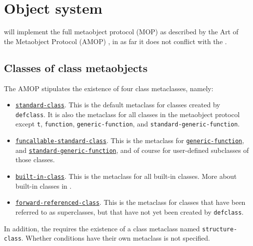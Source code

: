 \chapter{Object system}

\sysname{} will implement the full metaobject protocol (MOP) as
described by the Art of the Metaobject Protocol (AMOP)
\cite{Kiczales:1991:AMP:574212}, in as far it does not conflict with
the \hs{}.

\section{Classes of class metaobjects}

The AMOP stipulates the existence of four class metaclasses, namely:

\begin{itemize}
\item \href{http://www.metamodular.com/CLOS-MOP/class-standard-class.html}
  {\texttt{standard-class}}.
  This is the default metaclass for classes
  created by \texttt{defclass}.  It is also the metaclass for all
  classes in the metaobject protocol except \texttt{t},
  \texttt{function}, \texttt{generic-function}, and
  \texttt{standard-generic-function}. 
\item \href{http://www.metamodular.com/CLOS-MOP/class-funcallable-standard-class.html}
{\texttt{funcallable-standard-class}}.
This is the metaclass for
\href{http://www.metamodular.com/CLOS-MOP/class-generic-function.html}
{\texttt{generic-function}}, 
and 
\href{http://www.metamodular.com/CLOS-MOP/class-standard-generic-function.html}
{\texttt{standard-generic-function}},
and of course for user-defined subclasses of those classes. 
\item \href{http://www.metamodular.com/CLOS-MOP/class-built-in-class.html}
{\texttt{built-in-class}}.  
This is the metaclass for all built-in
classes.  More about built-in classes in
. 
\item \href{http://www.metamodular.com/CLOS-MOP/class-forward-referenced-class.html}
{\texttt{forward-referenced-class}}.  This is the metaclass for
  classes that have been referred to as superclasses, but that have
  not yet been created by \texttt{defclass}.
\end{itemize}

In addition, the \hs{} requires the existence of a class metaclass
named \texttt{structure-class}.  Whether conditions have their own
metaclass is not specified. 

